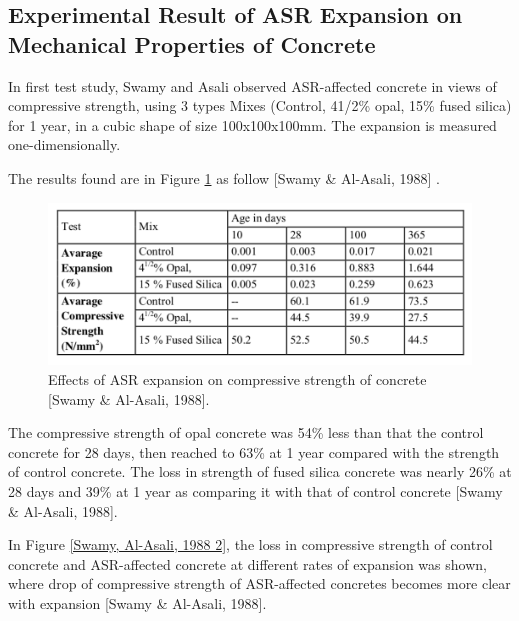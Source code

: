 \subsection{Experimental Result of ASR Expansion on Mechanical Properties of Concrete}

In first test study, Swamy and Asali\cite{Swamy} observed ASR-affected concrete in views of compressive strength, using 3 types Mixes (Control, 41/2\% opal, 15\% fused silica) for 1 year, in a cubic shape of size 100x100x100mm. The expansion is measured one-dimensionally.

The results found are in Figure \ref{Swamy1} as follow [Swamy \& Al-Asali, 1988] .

\begin{figure}[h!]
  \centering
  \includegraphics[width=0.8\linewidth]{Reference/temp3.png}
  \caption{Effects of ASR expansion on compressive strength of concrete [Swamy \& Al-Asali, 1988].}
  \label{Swamy1}
\end{figure}


The compressive strength of opal concrete was 54\% less than that the control concrete for 28 days, then reached to 63\% at 1 year compared with the strength of control concrete. The loss in strength of fused silica concrete was nearly 26\% at 28 days and 39\% at 1 year as comparing it with that of control concrete [Swamy \& Al-Asali, 1988].

In Figure \ref{Swamy, Al-Asali, 1988 2}, the loss in compressive strength of control concrete and ASR-affected concrete at different rates of expansion was shown, where drop of compressive strength of ASR-affected concretes becomes more clear with expansion [Swamy \& Al-Asali, 1988].

